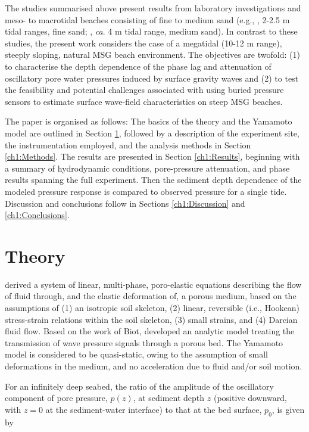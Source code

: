 The studies summarised above present results from laboratory investigations \citep[e.g.,][gravel beach]{PedrozoAcuna_etal2008} and meso- to macrotidal beaches consisting of fine to medium sand (e.g., \citet{Raubenheimer_etal1998}, 2-2.5 m tidal ranges, fine sand; \citet{Michallet_etal2009}, \textit{ca}. 4 m tidal range, medium sand). In contrast to these studies, the present work considers the case of a megatidal (10-12 m range), steeply sloping, natural MSG beach environment. The objectives are twofold: (1) to characterise the depth dependence of the phase lag and attenuation of oscillatory pore water pressures induced by surface gravity waves and (2) to test the feasibility and potential challenges associated with using buried pressure sensors to estimate surface wave-field characteristics on steep MSG beaches.

The paper is organised as follows: The basics of the theory and the Yamamoto model are outlined in Section \ref{ch1:Theory}, followed by a description of the experiment site, the instrumentation employed, and the analysis methods in Section \ref{ch1:Methods}. The results are presented in Section \ref{ch1:Results}, beginning with a summary of hydrodynamic conditions, pore-pressure attenuation, and phase results spanning the full experiment. Then the sediment depth dependence of the modeled pressure response is compared to observed pressure for a single tide. Discussion and conclusions follow in Sections \ref{ch1:Discussion} and \ref{ch1:Conclusions}.


\section{Theory}\label{ch1:Theory}
\citet{Biot1941} derived a system of linear, multi-phase, poro-elastic equations describing the flow of fluid through, and the elastic deformation of, a porous medium, based on the assumptions of (1) an isotropic soil skeleton, (2) linear, reversible (i.e., Hookean) stress-strain relations within the soil skeleton, (3) small strains, and (4) Darcian fluid flow. Based on the work of Biot, \citet{Yamamoto_etal1978} developed an analytic model treating the transmission of wave pressure signals through a porous bed. The Yamamoto model is considered to be quasi-static, owing to the assumption of small deformations in the medium, and no acceleration due to fluid and/or soil motion.

For an infinitely deep seabed, the ratio of the amplitude of the oscillatory component of pore pressure, $p(z)$, at sediment depth $z$ (positive downward, with $z = 0$ at the sediment-water interface) to that at the bed surface, $p_0$, is given by \citep{Yamamoto_etal1978}

